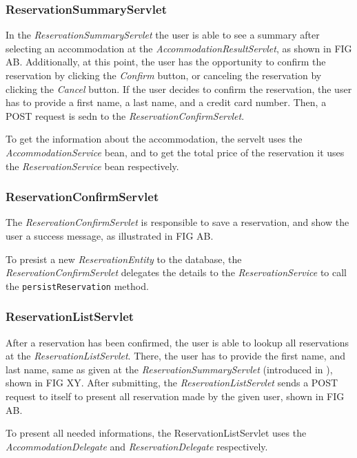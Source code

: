 \subsubsection{ReservationSummaryServlet}\label{sec:02_impl_web_reservationsummary}
In the \textit{ReservationSummaryServlet} the user is able to see a summary after selecting an accommodation at the \textit{AccommodationResultServlet}, as shown in FIG AB.
Additionally, at this point, the user has the opportunity to confirm the reservation by clicking the \textit{Confirm} button, or canceling the reservation by clicking the \textit{Cancel} button.
If the user decides to confirm the reservation, the user has to provide a first name, a last name, and a credit card number. Then, a POST request is sedn to the \textit{ReservationConfirmServlet}.

To get the information about the accommodation, the servelt uses the \textit{AccommodationService} bean, and to get the total price of the reservation it uses the \textit{ReservationService} bean respectively.

\subsubsection{ReservationConfirmServlet}\label{sec:02_impl_web_reservationconfirm}
The \textit{ReservationConfirmServlet} is responsible to save a reservation, and show the user a success message, as illustrated in FIG AB.

To presist a new \textit{ReservationEntity} to the database, the \textit{ReservationConfirmServlet} delegates the details to the \textit{ReservationService} to call the \texttt{persistReservation} method.

\subsubsection{ReservationListServlet}\label{sec:02_impl_web_myreservations}
After a reservation has been confirmed, the user is able to lookup all reservations at the \textit{ReservationListServlet}. 
There, the user has to provide the first name, and last name, same as given at the \textit{ReservationSummaryServlet} (introduced in ), shown in FIG XY. After submitting, the \textit{ReservationListServlet} sends a POST request to itself to present all reservation made by the given user, shown in FIG AB.

To present all needed informations, the ReservationListServlet uses the \textit{AccommodationDelegate} and \textit{ReservationDelegate} respectively.
